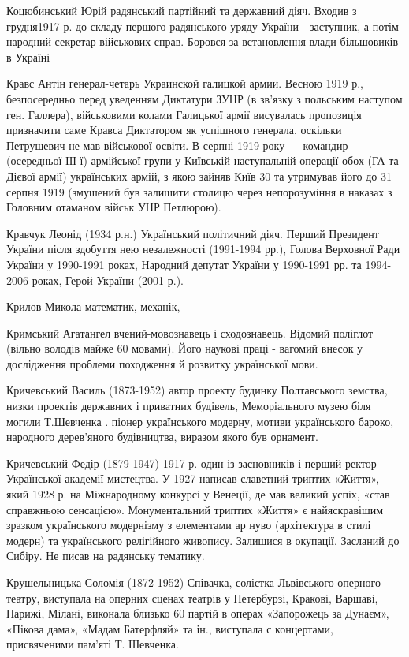 Коцюбинський Юрій радянський партійний та державний діяч. Входив з грудня1917 р. до складу першого радянського уряду України - заступник, а потім народний секретар військових справ. Боровся за встановлення влади більшовиків в Україні 

Кравс Антін генерал-четарь Украинской галицкой армии. Весною 1919 р., безпосередньо перед уведенням Диктатури ЗУНР (в зв'язку з польським наступом ген. Галлера), військовими колами Галицької армії висувалась пропозиція призначити саме Кравса Диктатором як успішного генерала, оскільки Петрушевич не мав військової освіти. В серпні 1919 року --- командир (осередньої ІІІ-ї) армійської групи у Київській наступальній операції обох (ГА та Дієвої армії) українських армій, з якою зайняв Київ 30 та утримував його до 31 серпня 1919 (змушений був залишити столицю через непорозуміння в наказах з Головним отаманом військ УНР Петлюрою).

Кравчук Леонід (1934 р.н.) Український політичний діяч. Перший Президент України після здобуття нею незалежності (1991-1994 рр.), Голова Верховної Ради України у 1990-1991 роках, Народний депутат України у 1990-1991 рр. та 1994-2006 роках, Герой України (2001 р.).

Крилов Микола математик, механік, 

Кримський Агатангел вчений-мовознавець і сходознавець. Відомий поліглот (вільно володів майже 60 мовами). Його наукові праці - вагомий внесок у дослідження проблеми поход­ження й розвитку української мови.

Кричевський Василь (1873-1952) автор проекту будинку Полтавського земства, низки проектів державних і приватних будівель, Меморіального музею біля могили Т.Шевченка . піонер українського модерну, мотиви українського бароко, народного дерев’яного будівництва, виразом якого був орнамент. 

Кричевський Федір  (1879-1947) 1917 р. один із засновників і перший ректор Української академії мистецтва. У 1927 написав славетний триптих «Життя», який  1928 р. на Міжнародному конкурсі у Венеції, де мав великий успіх, «став справжньою сенсацією». Монументальний триптих «Життя» є найяскравішим зразком українського модернізму з елементами ар нуво (архітектура в стилі модерн) та українського релігійного живопису. Залишися в окупації.  Засланий до Сибіру. Не писав на радянську тематику.

Крушельницька Соломія (1872-1952) Співачка, солістка Львівського оперного театру, виступала на оперних сценах театрів у Петербурзі, Кракові, Варшаві, Парижі, Мілані, виконала близько 60 партій в операх «Запорожець за Дунаєм», «Пікова дама», «Мадам Батерфляй» та ін., виступала с концертами, присвяченими пам’яті Т. Шевченка. 

